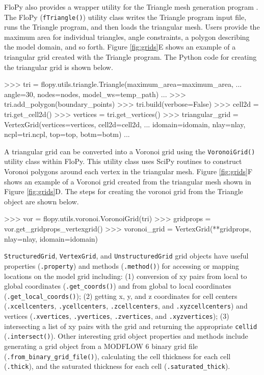 \documentclass[11pt, oneside]{article}  	%
\begin{document}
FloPy also provides a wrapper utility for the Triangle mesh generation program \citep{trianglemesh}. The FloPy (\texttt{fTriangle()}) utility class writes the Triangle program input file, runs the Triangle program, and then loads the triangular mesh. Users provide the maximum area for individual triangles, angle constraints, a polygon describing the model domain, and so forth. Figure \ref{fig:grids}E shows an example of a triangular grid created with the Triangle program. The Python code for creating the triangular grid is shown below.

\begin{python}
>>> tri = flopy.utils.triangle.Triangle(maximum_area=maximum_area, 
... angle=30, nodes=nodes, model_ws=temp_path)
...
>>> tri.add_polygon(boundary_points)
>>> tri.build(verbose=False)
>>> cell2d = tri.get_cell2d()
>>> vertices = tri.get_vertices()
>>> triangular_grid = VertexGrid(vertices=vertices, cell2d=cell2d, 
... idomain=idomain, nlay=nlay, ncpl=tri.ncpl, top=top, botm=botm)
...
\end{python}

A triangular grid can be converted into a Voronoi grid using the \texttt{VoronoiGrid()} utility class within FloPy. This utility class uses SciPy routines \citep{2020SciPy-NMeth} to construct Voronoi polygons around each vertex in the triangular mesh. Figure \ref{fig:grids}F shows an example of a Voronoi grid created from the triangular mesh shown in Figure \ref{fig:grids}D. The steps for creating the voronoi grid from the Triangle object are shown below.

\begin{python}
>>> vor = flopy.utils.voronoi.VoronoiGrid(tri)
>>> gridprops = vor.get_gridprops_vertexgrid()
>>> voronoi_grid = VertexGrid(**gridprops, nlay=nlay, idomain=idomain)
\end{python}

\texttt{StructuredGrid}, \texttt{VertexGrid}, and \texttt{UnstructuredGrid} grid objects have useful properties (\texttt{.property}) and methods (\texttt{.method()}) for accessing or mapping locations on the model grid including: (1) conversion of xy pairs from local to global coordinates (\texttt{.get\_coords()}) and from global to local coordinates (\texttt{.get\_local\_coords()}); (2) getting x, y, and z coordinates for cell centers (\texttt{.xcellcenters}, \texttt{.ycellcenters}, \texttt{.zcellcenters}, and \texttt{.xyzcellcenters}) and vertices (\texttt{.xvertices}, \texttt{.yvertices}, \texttt{.zvertices}, and \texttt{.xyzvertices}); (3) intersecting a list of xy pairs with the grid and returning the appropriate \texttt{cellid} (\texttt{.intersect()}). Other interesting grid object properties and methods include generating a grid object from a MODFLOW 6 binary grid file (\texttt{.from\_binary\_grid\_file()}), calculating the cell thickness for each cell (\texttt{.thick}), and the saturated thickness for each cell (\texttt{.saturated\_thick}).
\end{document}
